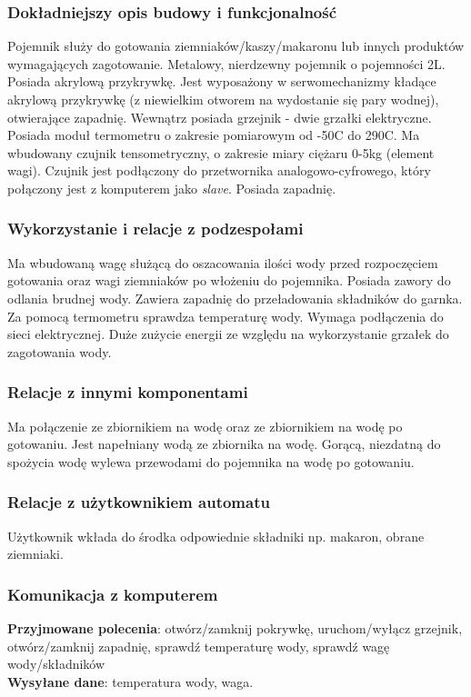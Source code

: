 \documentclass[12pt,a4paper,notitlepage]{article}
\begin{document}
\subsubsection{Dokładniejszy opis budowy i funkcjonalność}
Pojemnik służy do gotowania ziemniaków/kaszy/makaronu lub innych produktów wymagających zagotowanie. Metalowy, nierdzewny pojemnik o pojemności 2L. Posiada akrylową przykrywkę. Jest wyposażony w serwomechanizmy kładące akrylową przykrywkę (z niewielkim otworem na wydostanie się pary wodnej), otwierające zapadnię. Wewnątrz posiada grzejnik - dwie grzałki elektryczne. Posiada moduł termometru o zakresie pomiarowym od -50\degree C do 290\degree C. Ma wbudowany czujnik tensometryczny, o zakresie miary ciężaru 0-5kg (element wagi). Czujnik jest podłączony do przetwornika analogowo-cyfrowego, który połączony jest z komputerem jako \emph{slave}. Posiada zapadnię.
 
\subsubsection{Wykorzystanie i relacje z podzespołami}
Ma wbudowaną wagę służącą do oszacowania ilości wody przed rozpoczęciem gotowania oraz wagi ziemniaków po włożeniu do pojemnika. Posiada zawory do odlania brudnej wody. Zawiera zapadnię do przeładowania składników do garnka. Za pomocą termometru sprawdza temperaturę wody. Wymaga podłączenia do sieci elektrycznej. Duże zużycie energii ze względu na wykorzystanie grzałek do zagotowania wody.

\subsubsection{Relacje z innymi komponentami}
Ma połączenie ze zbiornikiem na wodę oraz ze zbiornikiem na wodę po gotowaniu. Jest napełniany wodą ze zbiornika na wodę. Gorącą, niezdatną do spożycia wodę wylewa przewodami do pojemnika na wodę po gotowaniu.

\subsubsection{Relacje z użytkownikiem automatu}
Użytkownik wkłada do środka odpowiednie składniki np. makaron, obrane ziemniaki.

\subsubsection{Komunikacja z komputerem}
\textbf{Przyjmowane polecenia}: otwórz/zamknij pokrywkę, uruchom/wyłącz grzejnik, otwórz/zamknij zapadnię, sprawdź temperaturę wody, sprawdź wagę wody/składników\\
\textbf{Wysyłane dane}: temperatura wody, waga.
\end{document}

